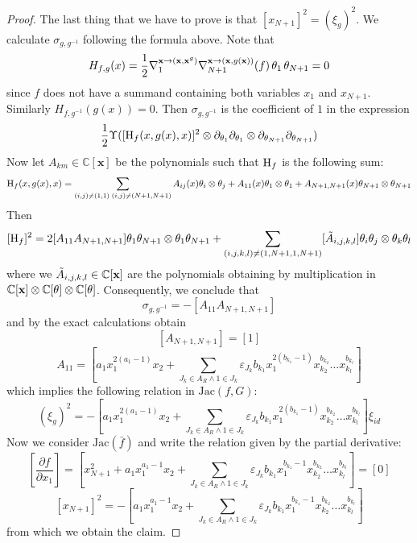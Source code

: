 \documentclass[reqno,12pt]{amsart}
\numberwithin{equation}{section}
\theoremstyle{plain}
\theoremstyle{definition}
\newcommand{\CC}{{\mathbb{C}}}
\newcommand{\Jac}{\mathrm{Jac}}
\newcommand{\bx}{{\bf x}}
\newcommand{\rmH}{{{\rm H}}}
\begin{document}
\begin{proof}
The last thing that we have to prove is that $[x_{N+1}]^2 = (\xi_g)^2$. We calculate $\sigma_{g,g^{-1}}$ following the formula above. Note that
\begin{align*}
H_{f,g}(x) = \frac{1}{2}\nabla^{\bx\to(\bx,\bx^g)}_1\nabla^{\bx\to(\bx,g(\bx))}_{N+1}(f)\,\theta_1\,\theta_{N+1} = 0
\end{align*}
since $f$ does not have a summand containing both variables $x_1$ and $x_{N+1}$. Similarly $H_{f, g^{-1}}(g(x))=0$. Then $\sigma_{g,g^{-1}}$ is the coefficient of $1$ in the expression
\begin{align*}
    \frac{1}{2}\Upsilon([\rmH_f(x,g(x),x)]^2\otimes\partial_{\theta_{1}}\partial_{\theta_{1}}\otimes\partial_{\theta_{N+1}}\partial_{\theta_{N+1}})
\end{align*}
    Now let $A_{km} \in \CC[\textbf{x}]$ be the polynomials such that $\rmH_f$ is the following sum:
\begin{align*}
    \rmH_f(x,g(x),x)= \sum_{ (i,j) \neq (1,1) \; (i,j) \neq (N+1,N+1)} A_{ij}(x)\theta_i \otimes \theta_j + A_{11}(x)\theta_1 \otimes \theta_1 + A_{N+1,N+1}(x)\theta_{N+1}\otimes\theta_{N+1}
\end{align*}
Then
\[[\rmH_f]^2= 2[A_{11}A_{N+1,N+1}]\theta_1\theta_{N+1}\otimes\theta_1\theta_{N+1} + \sum_{(i,j,k,l) \neq (1,N+1,1,N+1)}[\Tilde{A}_{i,j,k,l}]\theta_i\theta_j\otimes\theta_k\theta_l\]
where we $\Tilde{A}_{i,j,k,l} \in \CC[\textbf{x}]$ are the polynomials obtaining by multiplication in $\CC[\bx]\otimes \CC[\theta] \otimes \CC[\theta]$. Consequently, we conclude that
\[\sigma_{g,g^{-1}} = -[A_{11}A_{N+1,N+1}]\] 
and by the exact calculations obtain
\[[A_{N+1,N+1}] = [1]\]
\[A_{11} = [a_1x_1^{2(a_1-1)}x_2 + \sum_{J_k \in A_R \wedge 1 \in J_k} \varepsilon_{J_k}b_{k_1}x_1^{2(b_{k_1}-1)}x_{k_2}^{b_{k_2}} \dots x_{k_l}^{b_{k_l}}]\]
which implies the following relation in $\Jac(f,G)$:
\[(\xi_g)^2 = -[a_1x_1^{2(a_1-1)}x_2 + \sum_{J_k \in A_R \wedge 1 \in J_k} \varepsilon_{J_k}b_{k_1}x_1^{2(b_{k_1}-1)}x_{k_2}^{b_{k_2}} \dots x_{k_l}^{b_{k_l}}]\xi_{id}\]
Now we consider $\Jac(\bar{f})$ and write the relation given by the partial derivative:
\[[\frac{\partial f}{\partial x_1}] = [x_{N+1}^2 + a_1x_1^{a_1-1}x_2+ \sum_{J_k \in A_R \wedge 1 \in J_k} \varepsilon_{J_k}b_{k_1}x_1^{b_{k_1}-1}x_{k_2}^{b_{k_2}} \dots x_{k_l}^{b_{k_l}}] = [0]\]
\[
[x_{N+1}]^2 = - [ a_1x_1^{a_1-1}x_2 + \sum_{J_k \in A_R \wedge 1 \in J_k} \varepsilon_{J_k}b_{k_1}x_1^{b_{k_1}-1}x_{k_2}^{b_{k_2}} \dots x_{k_l}^{b_{k_l}}]
\]
from which we obtain the claim.
\end{proof}
\end{document}
